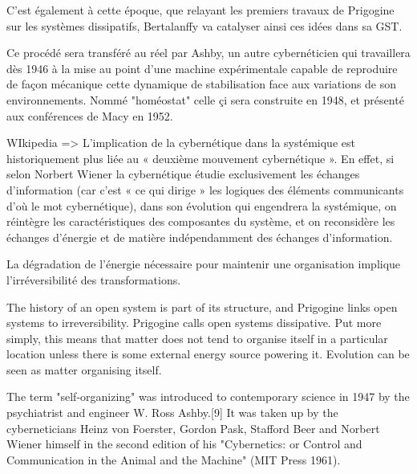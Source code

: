 {%


C'est également à cette époque, que relayant les premiers travaux de Prigogine sur les systèmes dissipatifs, Bertalanffy va catalyser ainsi ces idées dans sa GST.

Ce procédé sera transféré au réel par Ashby, un autre cybernéticien qui travaillera dès 1946 à la mise au point d'une machine expérimentale capable de reproduire de façon mécanique cette dynamique de stabilisation face aux variations de son environnements. Nommé "homéostat" celle çi sera construite en 1948, et présenté aux conférences de Macy en 1952.

WIkipedia => L'implication de la cybernétique dans la systémique est historiquement plus liée au « deuxième mouvement cybernétique ». En effet, si selon Norbert Wiener la cybernétique étudie exclusivement les échanges d'information (car c'est « ce qui dirige » les logiques des éléments communicants d'où le mot cybernétique), dans son évolution qui engendrera la systémique, on réintègre les caractéristiques des composantes du système, et on reconsidère les échanges d'énergie et de matière indépendamment des échanges d'information.

La dégradation de l'énergie nécessaire pour maintenir une organisation implique l'irréversibilité des transformations.


The history of an open system is part of its structure, and Prigogine links open systems to irreversibility. Prigogine calls open systems dissipative. Put more simply, this means that matter does not tend to organise itself in a particular location unless there is some external energy source powering it. Evolution can be seen as matter organising itself.


The term "self-organizing" was introduced to contemporary science in 1947 by the psychiatrist and engineer W. Ross Ashby.[9] It was taken up by the cyberneticians Heinz von Foerster, Gordon Pask, Stafford Beer and Norbert Wiener himself in the second edition of his "Cybernetics: or Control and Communication in the Animal and the Machine" (MIT Press 1961).

}
